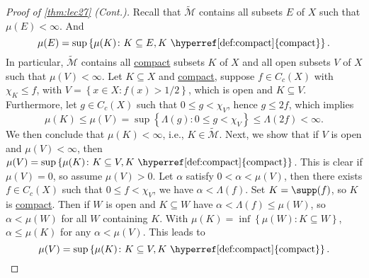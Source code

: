 \begin{proof}[Proof of \autoref{thm:lec27} (Cont.)]
	Recall that \(\widetilde{\mathcal{M}}\) contains all subsets \(E\) of \(X\) such that \(\mu (E) < \infty \). And
	\[
		\mu (E) = \sup \left\{ \mu (K)\colon K\subseteq E, K \text{ \hyperref[def:compact]{compact}} \right\}.
	\]
	In particular, \( \widetilde{\mathcal{M}} \) contains all \hyperref[def:compact]{compact} subsets \(K\) of \(X\) and all open subsets \(V\) of \(X\) such that \(\mu (V) < \infty \). Let \(K \subseteq X\) and \hyperref[def:compact]{compact}, suppose \(f\in C_c(X)\) with \(\chi _K \leq f\), with \(V = \left\{ x\in X\colon f(x) > 1 / 2 \right\} \), which is open and \(K \subseteq V\). Furthermore, let \(g\in C_c(X)\) such that \(0 \leq g < \chi _V\), hence \(g \leq 2f\), which implies
	\[
		\mu (K) \leq \mu (V) = \sup \left\{ \Lambda (g) \colon 0 \leq g < \chi _V \right\} \leq \Lambda (2f) < \infty.
	\]
	We then conclude that \(\mu (K) < \infty \), i.e., \(K\in \widetilde{\mathcal{M}} \). Next, we show that if \(V\) is open and \(\mu (V) < \infty \), then \(\mu (V) = \sup \left\{ \mu(K)\colon K \subseteq V, K \text{ \hyperref[def:compact]{compact}} \right\} \). This is clear if \(\mu (V) = 0\), so assume \(\mu (V) > 0\). Let \(\alpha \) satisfy \(0 < \alpha < \mu (V)\), then there exists \(f\in C_c(X)\) such that \(0 \leq f < \chi _V\), we have \(\alpha < \Lambda (f)\). Set \(K = \supp(f) \), so \(K\) is \hyperref[def:compact]{compact}. Then if \(W\) is open and \(K \subseteq W\) have \(\alpha < \Lambda (f) \leq \mu (W)\), so \(\alpha < \mu (W)\) for all \(W\) containing \(K\). With \(\mu (K) = \inf \left\{ \mu (W) \colon K \subseteq W \right\} \), \(\alpha \leq \mu (K)\) for any \(\alpha < \mu (V)\). This leads to
	\[
		\mu (V) = \sup \left\{ \mu (K) \colon K \subseteq V, K \text{ \hyperref[def:compact]{compact}} \right\}.
	\]


\end{proof}
